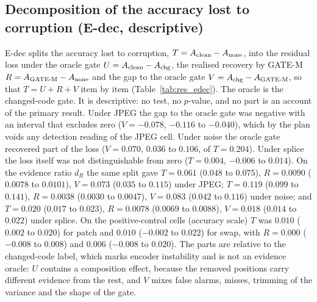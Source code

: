 \subsection{Decomposition of the accuracy lost to corruption (E-dec, descriptive)}\label{ssec:res_edec}
E-dec splits the accuracy lost to corruption, $T=A_{\rm clean}-A_{\rm none}$, into the residual loss under the oracle gate
$U=A_{\rm clean}-A_{\rm chg}$, the realised recovery by GATE-M $R=A_{\rm GATE\text{-}M}-A_{\rm none}$ and the gap to the oracle gate
$V=A_{\rm chg}-A_{\rm GATE\text{-}M}$, so that $T=U+R+V$ item by item (Table~\ref{tab:res_edec}).
The oracle is the changed-code gate.
It is descriptive: no test, no $p$-value, and no part is an account of the primary result.
Under JPEG the gap to the oracle gate was negative with an interval that excludes zero ($V=-0.078$, $-0.116$ to $-0.040$), which by the
plan voids any detection reading of the JPEG cell.
Under noise the oracle gate recovered part of the loss ($V=0.070$, $0.036$ to $0.106$, of $T=0.204$).
Under splice the loss itself was not distinguishable from zero ($T=0.004$, $-0.006$ to $0.014$).
On the evidence ratio $d_R$ the same split gave $T=0.061$ ($0.048$ to $0.075$), $R=0.0090$ ($0.0078$ to $0.0101$), $V=0.073$ ($0.035$ to
$0.115$) under JPEG; $T=0.119$ ($0.099$ to $0.141$), $R=0.0038$ ($0.0030$ to $0.0047$), $V=0.083$ ($0.042$ to $0.116$) under noise;
and $T=0.020$ ($0.017$ to $0.023$), $R=0.0078$ ($0.0069$ to $0.0088$), $V=0.018$ ($0.014$ to $0.022$) under splice.
On the positive-control cells (accuracy scale) $T$ was $0.010$ ($0.002$ to $0.020$) for patch and $0.010$ ($-0.002$ to $0.022$) for swap,
with $R=0.000$ ($-0.008$ to $0.008$) and $0.006$ ($-0.008$ to $0.020$).
The parts are relative to the changed-code label, which marks encoder instability and is not an evidence oracle: $U$ contains a
composition effect, because the removed positions carry different evidence from the rest, and $V$ mixes false alarms, misses,
trimming of the variance and the shape of the gate.

